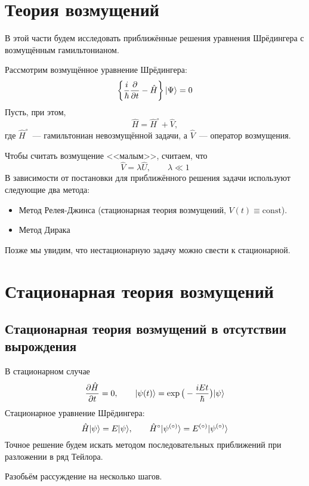 \setcounter{section}{0}
\section{Теория возмущений}
В этой части будем исследовать приближённые решения уравнения Шрёдингера с возмущённым гамильтонианом.

Рассмотрим возмущённое уравнение Шрёдингера:
$$
\left\{
    \dfrac{i}{\hbar} \dfrac{\partial }{\partial t} - \hat H
\right\} | \Psi \rangle = 0
$$
Пусть, при этом,
$$
    \hat H = \hat H^\circ + \hat V,
$$
где $\hat H^\circ$~--- гамильтониан невозмущённой задачи, а $\hat V$~--- оператор возмущения.

Чтобы считать возмущение <<малым>>, считаем, что
$$
    \hat V = \lambda \hat U, \qquad \lambda \ll 1
$$
В зависимости от постановки для приближённого решения задачи используют следующие два метода:
\begin{itemize}
  \item Метод Релея-Джинса (стационарная теория возмущений, $V(t) \equiv \mathrm{const}$).
  \item Метод Дирака
\end{itemize}
Позже мы увидим, что нестационарную задачу можно свести к стационарной.

\section{Стационарная теория возмущений}

\subsection{Стационарная теория возмущений в отсутствии вырождения}
В стационарном случае
$$
    \dfrac{\partial \hat H}{\partial t} = 0, \qquad | \psi(t) \rangle = \exp \big( -\dfrac{iEt}{\hbar} \big) | \psi \rangle
$$
Стационарное уравнение Шрёдингера:
$$
    \hat H | \psi \rangle = E | \psi \rangle, \qquad \hat H^\circ | \psi^{(\circ)} \rangle = E^{(\circ)} | \psi^{(\circ)} \rangle
$$
Точное решение будем искать методом последовательных приближений при разложении в ряд Тейлора.

Разобьём рассуждение на несколько шагов.

